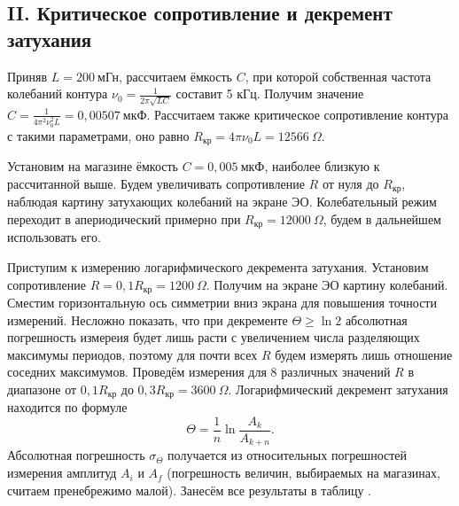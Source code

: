 \documentclass[a4paper,10pt]{article}
\begin{document}
\subsection*{II. Критическое сопротивление и декремент затухания}

Приняв $L=200~\text{мГн}$, рассчитаем ёмкость $C$, при которой собственная частота колебаний контура $\nu_0=\frac{1}{2\pi\sqrt{LC}}$ составит 5 кГц. Получим значение $C=\frac{1}{4\pi^2\nu_0^2L}=0,00507~\text{мкФ}$. Рассчитаем также критическое сопротивление контура с такими параметрами, оно равно $R_{\text{кр}}=4\pi\nu_0L=12566~\Omega$.

Установим на магазине ёмкость $C=0,005~\text{мкФ}$, наиболее близкую к рассчитанной выше. Будем увеличивать сопротивление $R$ от нуля до $R_{\text{кр}}$, наблюдая картину затухающих колебаний на экране ЭО. Колебательный режим переходит в апериодический примерно при $R_{\text{кр}}=12000~\Omega$, будем в дальнейшем использовать его.

Приступим к измерению логарифмического декремента затухания. Установим сопротивление $R=0,1R_{\text{кр}}=1200~\Omega$. Получим на экране ЭО картину колебаний. Сместим горизонтальную ось симметрии вниз экрана для повышения точности измерений. Несложно показать, что при декременте $\Theta\geq\ln2$ абсолютная погрешность измереия будет лишь расти с увеличением числа разделяющих максимумы периодов, поэтому для почти всех $R$ будем измерять лишь отношение соседних максимумов. Проведём измерения для 8 различных значений $R$ в диапазоне от $0,1R_{\text{кр}}$ до $0,3R_{\text{кр}}=3600~\Omega$. Логарифмический декремент затухания находится по формуле\[\Theta=\frac{1}{n}\ln{\frac{A_k}{A_{k+n}}}.\]Абсолютная погрешность $\sigma_{\Theta}$ получается из относительных погрешностей измерения амплитуд $A_i$ и $A_f$ (погрешность величин, выбираемых на магазинах, считаем пренебрежимо малой). Занесём все результаты в таблицу .
\end{document}
